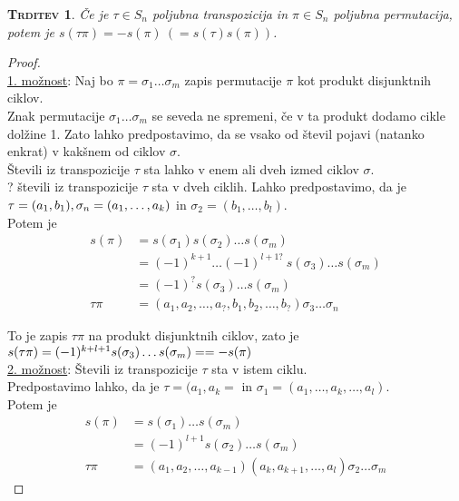 \documentclass[a4paper,12pt]{article}
\newtheorem*{trditev}{\textsc{Trditev}}
\begin{document}
\begin{trditev}
Če je $\tau \in S_n$ poljubna transpozicija in $\pi \in S_n$ poljubna permutacija, potem je $s(\tau \pi)=-s(\pi)~(=s(\tau)s(\pi))$.\\
\end{trditev}

\begin{proof} ~\\

\underline{1. možnost}: Naj bo $\pi=\sigma_1\ldots \sigma_m$ zapis permutacije $\pi$ kot produkt disjunktnih ciklov. \\

Znak permutacije $\sigma_1\ldots \sigma_m$ se seveda ne spremeni, če v ta produkt dodamo cikle dolžine 1. Zato lahko predpostavimo, da se vsako od števil pojavi (natanko enkrat) v kakšnem od ciklov $\sigma$. \\

Števili iz transpozicije $\tau$ sta lahko v enem ali dveh izmed ciklov $\sigma$. \\

\noindent ? števili iz transpozicije $\tau$ sta v dveh ciklih. Lahko predpostavimo, da je $\tau=(a_1,b_1), \linebreak \sigma_n=(a_1,\ldots,a_k)$ in $\sigma_2=(b_1,\ldots,b_l)$. \\

Potem je 
\begin{align*}
s(\pi) & = s(\sigma_1)s(\sigma_2)\ldots s(\sigma_m)\\
& = (-1)^{k+1}\ldots(-1)^{l+1?}~s(\sigma_3)\ldots s(\sigma_m)\\
& =(-1)^{?} s(\sigma_3)\ldots s(\sigma_m) \\
\tau \pi & =(a_1,a_2,\ldots,a_?,b_1,b_2,\ldots,b_?)\sigma_3\ldots \sigma_n
\end{align*}

\noindent To je zapis $\tau \pi$ na produkt disjunktnih ciklov, zato je
$s(\tau \pi)=(-1)^{k+l+1}s(\sigma_3)\ldots s(\sigma_m)= \linebreak = -s(\pi)$
\\

\noindent \underline{2. možnost}: Števili iz transpozicije $\tau$ sta v istem ciklu. \\

Predpostavimo lahko, da je $\tau=(a_1,a_k=$ in $\sigma_1=(a_1,\ldots,a_k,\ldots,a_l)$. \\

Potem je 
\begin{align*}
s(\pi) & = s(\sigma_1)\ldots s(\sigma_m) \\
& = (-1)^{l+1}s(\sigma_2)\ldots s(\sigma_m) \\
\tau \pi & = (a_1,a_2,\ldots,a_{k-1})(a_k,a_{k+1},\ldots,a_l)\sigma_2\ldots \sigma_m 
\end{align*} 


\end{proof}
\end{document}
